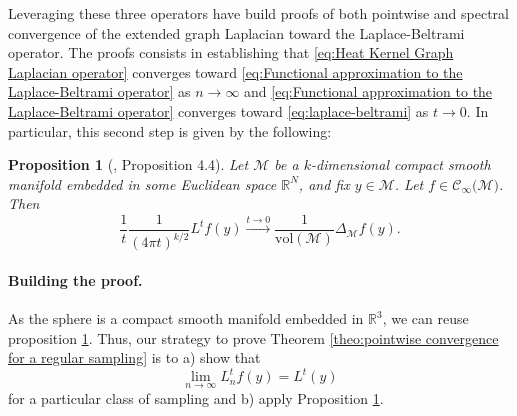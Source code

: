 \documentclass{article} %
\newtheorem{definition}{Definition}[section]
\newtheorem{prop}{Proposition}
\renewcommand{\b}[1]{{\bm{#1}}}  %
\renewcommand{\S}{\mathbb{S}}
\begin{document}
Leveraging these three operators \cite{belkin2005towards, belkin2007convergence} have build proofs of both pointwise and spectral convergence of the extended graph Laplacian toward the Laplace-Beltrami operator.
The proofs consists in establishing that \eqref{eq:Heat Kernel Graph Laplacian operator} converges toward \eqref{eq:Functional approximation to the Laplace-Beltrami operator} as $n\rightarrow \infty$ and \eqref{eq:Functional approximation to the Laplace-Beltrami operator} converges toward \eqref{eq:laplace-beltrami} as $t\rightarrow 0$. In particular, this second step is given by the following:
\begin{prop}
[\cite{belkin2005towards}, Proposition 4.4]
Let $\mathcal{M}$ be a $k$-dimensional compact smooth manifold embedded in some Euclidean space $\mathbb{R}^N$, and fix $y\in\mathcal{M}$. Let $f\in\mathcal{C}_\infty(\mathcal{M)}$. Then
\begin{equation}
\frac{1}{t}\frac{1}{(4\pi t)^{k/2}} L^tf(y) \xrightarrow{t\to 0 } \frac{1}{\text{vol}(\mathcal M)}\Delta_{\mathcal M}f(y).
\end{equation}
\label{prop:3}
\end{prop}

\paragraph{Building the proof.}
As the sphere is a compact smooth manifold embedded in $\mathbb{R}^3$, we can reuse proposition \ref{prop:3}. Thus, our strategy to prove Theorem \ref{theo:pointwise convergence for a regular sampling} is to a) show that
\begin{equation}\label{eq:continuous convergence}
 \lim_{n\to\infty}L_n^{t} f(y) =  L^t(y)
\end{equation}
for a particular class of sampling and b) apply Proposition \ref{prop:3}.



\end{document}
